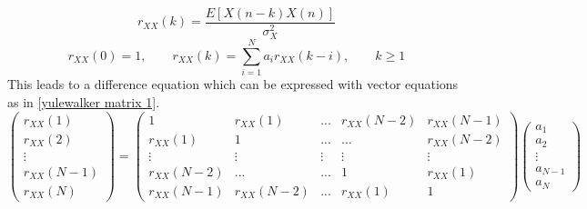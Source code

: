 \begin{equation}\label{Autocorrelation}
r_{XX}(k) = \frac{E[X(n-k)X(n)]}{\sigma_X^2}
\end{equation}
\begin{equation}\label{YuleWalker 1}
r_{XX}(0) = 1,\qquad 
r_{XX}(k) = \sum_{i=1}^{N}{a_ir_{XX}(k-i)}, \qquad k \geq 1
\end{equation}
This leads to a difference equation which can be expressed with vector equations as in \ref{yulewalker matrix 1}.
\begin{equation}\label{yulewalker matrix 1}
\begin{pmatrix}
r_{XX}(1) \\ 
r_{XX}(2) \\ 
\vdots \\ 
r_{XX}(N-1)\\ 
r_{XX}(N) 
\end{pmatrix} =  
\begin{pmatrix}
1 & r_{XX}(1) & ... & r_{XX}(N-2) & r_{XX}(N-1) \\
r_{XX}(1) & 1 & ... & ... & r_{XX}(N-2) \\
\vdots    & \vdots    & \vdots & \vdots & \vdots \\
r_{XX}(N-2) & ... & ... & 1 & r_{XX}(1) \\
r_{XX}(N-1) & r_{XX}(N-2) & ... & r_{XX}(1) & 1
\end{pmatrix} 
\begin{pmatrix} 
a_{1} \\ 
a_{2} \\
\vdots \\
a_{N-1} \\
a_{N} \end{pmatrix}
\end{equation}
